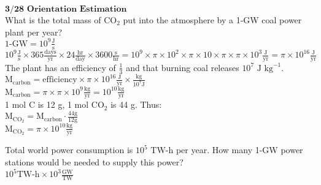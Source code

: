 \documentclass[11pt,a4paper,margin=1in]{article}
\begin{document}
\begin{flushleft}
    $\textbf{3/28 Orientation Estimation}$\\
    What is the total mass of $\text{CO}_2$ put into the atmosphere by a 1-GW coal power plant per year?\\
    $\text{1-GW} = 10^9 \frac{\text{J}}{\text{s}}$\\
    $10^9 \frac{\text{J}}{\text{s}} \times 365 \frac{\text{days}}{\text{yr}} \times 24 \frac{\text{hr}}{\text{day}}
        \times 3600 \frac{\text{s}}{\text{hr}} = 10^9 \times \pi \times 10^2 \times \pi \times 10 \times \pi \times \pi
        \times 10^3 \frac{\text{J}}{\text{yr}} = \pi \times 10^{16} \frac{\text{J}}{\text{yr}}$\\
    The plant has an efficiency of $\frac{1}{3}$ and that burning coal releases $10^7 \text{ J kg}^{-1}$.\\
    $\text{M}_\text{carbon} = \text{efficiency} \times \pi \times 10^{16} \frac{\text{J}}{\text{yr}} \times \frac{\text{kg}}{10^7 \text{J}}$\\
    $\text{M}_\text{carbon} = \pi \times \pi \times 10^{9} \frac{\text{kg}}{\text{yr}} = 10^{10} \frac{\text{kg}}{\text{yr}}$\\
    1 mol C is 12 g, 1 mol $\text{CO}_2$ is 44 g. Thus: \\
    $\text{M}_{\text{CO}_2} = \text{M}_\text{carbon} \cdot \frac{44\text{g}}{12\text{g}}$\\
    $\text{M}_{\text{CO}_2} = \pi \times 10^{10} \frac{\text{kg}}{\text{yr}}$\\
\end{flushleft}
\begin{flushleft}
    Total world power consumption is $10^5$ TW-h per year. How many 1-GW power stations would be needed to supply this power?\\
    $10^5\text{TW-h} \times 10^3\frac{\text{GW}}{\text{TW}}$
\end{flushleft}
\end{document}

